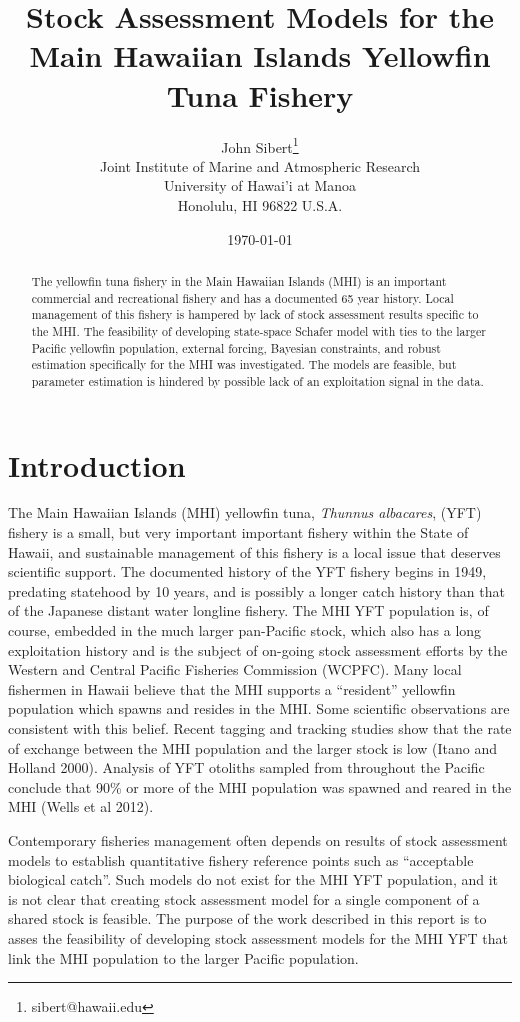 \documentclass[12pt,letterpaper,twoside]{article}
\title{Stock Assessment Models for the
Main Hawaiian Islands Yellowfin Tuna Fishery}
\author{
John Sibert\thanks{sibert@hawaii.edu}\\
Joint Institute of Marine and Atmospheric Research\\
University of Hawai'i at Manoa\\
Honolulu, HI  96822 U.S.A.\\[0.125in]
\date{\today}
}
\newcommand\doublespacing{\baselineskip=1.6\normalbaselineskip}
\begin{document}
\maketitle


\begin{abstract}
The yellowfin tuna fishery in the Main Hawaiian Islands (MHI)
is an important commercial and recreational fishery and
has a documented 65 year history. Local management of this fishery is
hampered by lack of stock assessment results specific to the MHI. The
feasibility of developing state-space Schafer model with ties to the
larger Pacific yellowfin population,
external forcing, Bayesian constraints, and robust estimation
specifically for the MHI was investigated. The models are feasible, but
parameter estimation is hindered by possible lack of an exploitation
signal in the data.
\end{abstract}

\section{Introduction}
The Main Hawaiian Islands (MHI) yellowfin tuna,
{\it Thunnus albacares}, (YFT) fishery is 
a small, but very important important fishery within the State of
Hawaii, and sustainable management of this
fishery is a local issue that deserves scientific support.
The documented history of the YFT fishery begins in
1949, predating statehood by 10 years, and is possibly a longer catch
history than that of the Japanese distant water longline fishery.
The MHI YFT population is, of course,
embedded in the much larger pan-Pacific stock, which also has a long
exploitation history and is the subject of on-going stock assessment
efforts by the Western and Central Pacific Fisheries Commission (WCPFC).
Many local fishermen in Hawaii
believe that the MHI supports a ``resident'' yellowfin population
which spawns and resides in the MHI.
Some scientific observations are consistent with this belief. 
Recent tagging and tracking
studies show that the rate of exchange between the MHI population
and the larger stock is low (Itano and Holland 2000). 
Analysis of YFT otoliths sampled from
throughout the Pacific conclude that 90\% or more of the MHI
population was spawned and reared in the MHI (Wells et al 2012).

Contemporary fisheries management often depends on results of stock
assessment models to establish quantitative fishery reference points
such as ``acceptable biological catch''.
Such models do not exist for the MHI YFT population, and
it is not clear that creating stock assessment model
for a single component of a shared stock is feasible.
The purpose of the work described in this report is to asses the
feasibility of developing stock assessment models for the MHI YFT
that link the MHI population to the larger Pacific population.
\end{document}
